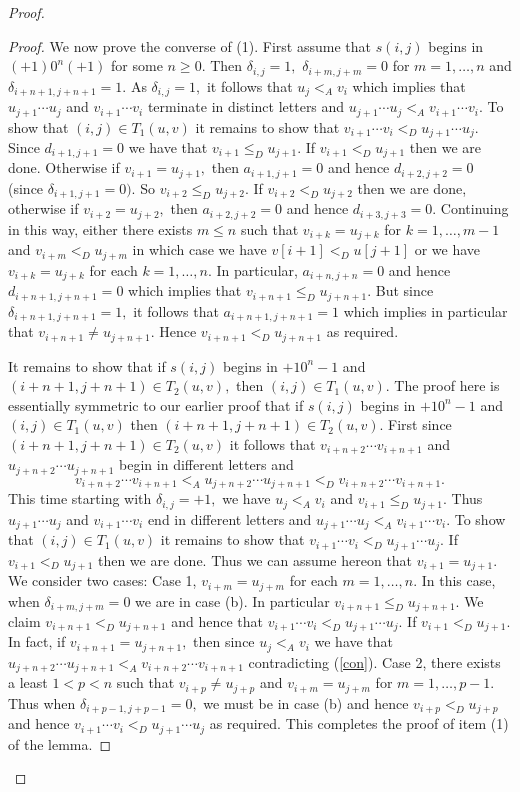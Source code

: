 \documentclass[12pt,a4paper]{amsart}
\begin{document}
\begin{proof}
\begin{proof}
We now prove the converse of (1). First assume that $s(i,j)$ begins in $(+1)0^n(+1)$ for some $n\geq 0.$ Then $\delta_{i,j}=1,$ $\delta_{i+m,j+m}=0$ for $m=1,\ldots, n$ and $\delta_{i+n+1,j+n+1}=1.$ As $\delta_{i,j}=1,$  it follows that $u_j<_A v_i$ which implies that $u_{j+1}\cdots u_j$ and $v_{i+1}\cdots v_i$ terminate in distinct letters and  $u_{j+1}\cdots u_j<_A v_{i+1}\cdots v_i.$ To show that $(i,j)\in T_1(u,v)$ it remains to show that 
$v_{i+1}\cdots v_i<_D u_{j+1}\cdots u_j.$   Since $d_{i+1,j+1}=0$ we have that $v_{i+1}\leq _D u_{j+1}.$ If $v_{i+1}<_Du_{j+1}$ then we are done. Otherwise if $v_{i+1}=u_{j+1},$
 then $a_{i+1,j+1}=0$ and hence $d_{i+2,j+2}=0$ (since $\delta_{i+1,j+1}=0).$ So $v_{i+2}\leq_D u_{j+2}.$ If $v_{i+2}<_D u_{j+2}$ then we are done, otherwise if $v_{i+2}=u_{j+2},$ then $a_{i+2,j+2}=0$ and hence $d_{i+3,j+3}=0.$  Continuing in this way, either there exists $m\leq n$ such that $v_{i+k}=u_{j+k}$ for $k=1,\ldots ,m-1$ and $v_{i+m}<_D u_{j+m}$ in which case we have $v[i+1]<_D u[j+1]$ or we have $v_{i+k}=u_{j+k}$ for each $k=1,\ldots ,n.$ In particular, $a_{i+n,j+n}=0$ and hence $d_{i+n+1,j+n+1}=0$ which implies that $v_{i+n+1}\leq_D u_{j+n+1}.$ But since $\delta_{i+n+1,j+n+1}=1,$ it follows that $a_{i+n+1,j+n+1}=1$ which implies in particular that $v_{i+n+1}\neq u_{j+n+1}.$ Hence  $v_{i+n+1}<_D u_{j+n+1}$ as required. 
 
 It remains to show that if $s(i,j)$ begins in $+10^n-1$ and $(i+n+1,j+n+1)\in T_2(u,v),$ then $(i,j)\in T_1(u,v).$ The proof here is essentially symmetric to our earlier proof that if $s(i,j)$ begins in $+10^n-1$  and $(i,j)\in T_1(u,v)$ then $(i+n+1,j+n+1)\in T_2(u,v).$ 
First since $(i+n+1,j+n+1)\in T_2(u,v)$ it follows that $v_{i+n+2}\cdots v_{i+n+1}$ and $u_{j+n+2}\cdots u_{j+n+1}$ begin in different letters and
\begin{equation}\label{con}v_{i+n+2}\cdots v_{i+n+1} <_A  u_{j+n+2}\cdots u_{j+n+1}   <_D v_{i+n+2}\cdots v_{i+n+1}.\end{equation}
This time starting with $\delta_{i,j}=+1,$ we have $u_j<_A v_i$ and $v_{i+1}\leq _D u_{j+1}.$ Thus $u_{j+1}\cdots u_j$ and $v_{i+1}\cdots v_i$ end in different letters and $u_{j+1}\cdots u_j <_A v_{i+1}\cdots v_i.$ To show that $(i,j)\in T_1(u,v)$ it remains to show that $v_{i+1}\cdots v_i <_D  u_{j+1}\cdots u_j.$ If $v_{i+1}<_D u_{j+1}$ then we are done. Thus we can assume hereon that $v_{i+1}=u_{j+1}.$ We consider two cases: Case 1,  $v_{i+m}=u_{j+m}$ for each $m=1,\ldots ,n.$ In this case, when $\delta_{i+m,j+m}=0$ we are in case (b).  In particular $v_{i+n+1}\leq _D u_{j+n+1}.$ We claim $v_{i+n+1} <_D u_{j+n+1}$ and hence that $v_{i+1}\cdots v_i <_D  u_{j+1}\cdots u_j.$ If $v_{i+1}<_D u_{j+1}.$  In fact,  if  $v_{i+n+1}= u_{j+n+1},$ then since $u_j<_A v_i$ we have that $u_{j+n+2}\cdots u_{j+n+1} <_Av_{i+n+2}\cdots v_{i+n+1}$ contradicting (\ref{con}).
Case 2, there exists a least $1<p<n$ such that $v_{i+p}\neq u_{j+p}$ and $v_{i+m}=u_{j+m}$ for $m=1,\ldots ,p-1.$ Thus when $\delta_{i+p-1,j+p-1}=0,$ we must be in case (b) and hence $v_{i+p}<_D u_{j+p}$ and hence $v_{i+1}\cdots v_i<_D u_{j+1}\cdots u_j$ as required. This completes the proof of item (1)  of the lemma. \end{proof}


\end{proof}
\end{document}
